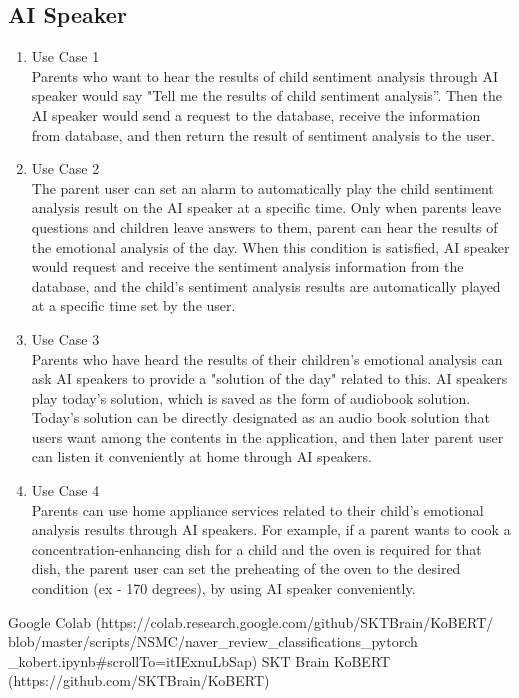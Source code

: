 \documentclass[conference]{IEEEtran}
\begin{document}
\subsection{AI Speaker}
\begin{enumerate}
    \item Use Case 1 
    \\Parents who want to hear the results of child sentiment analysis through AI speaker would say "Tell me the results of child sentiment analysis”. Then the AI speaker would send a request to the database, receive the information from database, and then return the result of sentiment analysis to the user.
    \item Use Case 2
    \\The parent user can set an alarm to automatically play the child sentiment analysis result on the AI speaker at a specific time. Only when parents leave questions and children leave answers to them, parent can hear the results of the emotional analysis of the day. When this condition is satisfied, AI speaker would request and receive the sentiment analysis information from the database, and the child's sentiment analysis results are automatically played at a specific time set by the user.
    \item Use Case 3
    \\Parents who have heard the results of their children's emotional analysis can ask AI speakers to provide a "solution of the day" related to this. AI speakers play today's solution, which is saved as the form of audiobook solution. Today's solution can be directly designated as an audio book solution that users want among the contents in the application, and then later parent user can listen it conveniently at home through AI speakers.
    \item Use Case 4 
    \\Parents can use home appliance services related to their child's emotional analysis results through AI speakers. For example, if a parent wants to cook a concentration-enhancing dish for a child and the oven is required for that dish, the parent user can set the preheating of the oven to the desired condition (ex - 170 degrees), by using AI speaker conveniently.
\end{enumerate}
\clearpage
\begin{thebibliography}{00}

 Google Colab (https://colab.research.google.com/github/SKTBrain/KoBERT/\\blob/master/scripts/NSMC/naver\_review\_classifications\_pytorch\\\_kobert.ipynb#scrollTo=itIExnuLbSap)
 SKT Brain KoBERT (https://github.com/SKTBrain/KoBERT)
\end{thebibliography}

    
\end{document}
